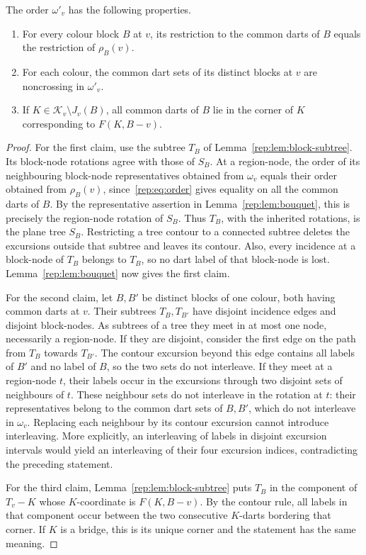 \begin{lemma}
\label{rep:lem:common-order}
The order $\omega'_v$ has the following properties.
\begin{enumerate}
\item For every colour block $B$ at $v$, its restriction to the common darts
of $B$ equals the restriction of $\rho_B(v)$.
\item For each colour, the common dart sets of its distinct blocks at $v$
are noncrossing in $\omega'_v$.
\item If $K\in\mathcal K_v\setminus J_v(B)$, all common darts of $B$
lie in the corner of $K$ corresponding to $F(K,B-v)$.
\end{enumerate}
\end{lemma}

\begin{proof}
For the first claim, use the subtree $T_B$ of
Lemma~\ref{rep:lem:block-subtree}.  Its block-node rotations agree with
those of $S_B$.  At a region-node, the order of its neighbouring block-node
representatives obtained from $\omega_v$ equals their order obtained from
$\rho_B(v)$, since~\eqref{rep:eq:order} gives equality on all the common
darts of $B$.  By the representative assertion in
Lemma~\ref{rep:lem:bouquet}, this is precisely the region-node rotation of
$S_B$.  Thus $T_B$, with the inherited rotations, is the plane tree $S_B$.
Restricting a tree contour to a connected subtree deletes the excursions
outside that subtree and leaves its contour.  Also, every incidence at a
block-node of $T_B$ belongs to $T_B$, so no dart label of that block-node is
lost.  Lemma~\ref{rep:lem:bouquet} now gives the first claim.

For the second claim, let $B,B'$ be distinct blocks of one colour, both
having common darts at $v$.  Their subtrees $T_B,T_{B'}$ have disjoint
incidence edges and disjoint block-nodes.  As subtrees of a tree they meet
in at most one node, necessarily a region-node.  If they are disjoint,
consider the first edge on the path from $T_B$ towards $T_{B'}$.  The
contour excursion beyond this edge contains all labels of $B'$ and no
label of $B$, so the two sets do not interleave.  If they meet at a
region-node $t$, their labels occur in the excursions through two disjoint
sets of neighbours of $t$.  These neighbour sets do not interleave in the
rotation at $t$: their representatives belong to the common dart sets of
$B,B'$, which do not interleave in $\omega_v$.  Replacing each neighbour
by its contour excursion cannot introduce interleaving.  More explicitly,
an interleaving of labels in disjoint excursion intervals would yield an
interleaving of their four excursion indices, contradicting the preceding
statement.

For the third claim, Lemma~\ref{rep:lem:block-subtree} puts $T_B$ in the
component of $T_v-K$ whose $K$-coordinate is $F(K,B-v)$.  By the contour
rule, all labels in that component occur between the two consecutive
$K$-darts bordering that corner.  If $K$ is a bridge, this is its unique
corner and the statement has the same meaning.
\end{proof}

